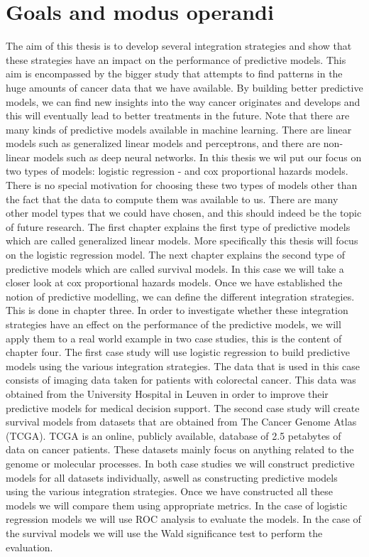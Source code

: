 \section{Goals and modus operandi}
The aim of this thesis is to develop several integration strategies and show that these strategies have an impact on the performance of predictive models. This aim is encompassed by the bigger study that attempts to find patterns in the huge amounts of cancer data that we have available. By building better predictive models, we can find new insights into the way cancer originates and develops and this will eventually lead to better treatments in the future. Note that there are many kinds of predictive models available in machine learning. There are linear models such as generalized linear models and perceptrons, and there are non-linear models such as deep neural networks. In this thesis we wil put our focus on two types of models: logistic regression - and cox proportional hazards models. There is no special motivation for choosing these two types of models other than the fact that the data to compute them was available to us. There are many other model types that we could have chosen, and this should indeed be the topic of future research. The first chapter explains the first type of predictive models which are called generalized linear models. More specifically this thesis will focus on the logistic regression model. The next chapter explains the second type of predictive models which are called survival models. In this case we will take a closer look at cox proportional hazards models. Once we have established the notion of predictive modelling, we can define the different integration strategies. This is done in chapter three. In order to investigate whether these integration strategies have an effect on the performance of the predictive models, we will apply them to a real world example in two case studies, this is the content of chapter four. The first case study will use logistic regression to build predictive models using the various integration strategies. The data that is used in this case consists of imaging data taken for patients with colorectal cancer. This data was obtained from the University Hospital in Leuven in order to improve their predictive models for medical decision support. The second case study will create survival models from datasets that are obtained from The Cancer Genome Atlas (TCGA). TCGA is an online, publicly available, database of 2.5 petabytes of data on cancer patients. These datasets mainly focus on anything related to the genome or molecular processes. In both case studies we will construct predictive models for all datasets individually, aswell as constructing predictive models using the various integration strategies. Once we have constructed all these models we will compare them using appropriate metrics. In the case of logistic regression models we will use ROC analysis to evaluate the models. In the case of the survival models we will use the Wald significance test to perform the evaluation. \\ \\
